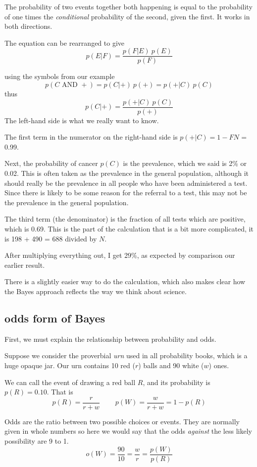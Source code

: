 \documentclass[11pt, oneside]{article}
\begin{document}
The probability of two events together both happening is equal to the probability of one times the \emph{conditional} probability of the second, given the first.  It works in both directions.

The equation can be rearranged to give
\[ p(E|F) = \frac{p(F|E) \ p(E)}{p(F)} \]

using the symbols from our example
\[ p(C \text{ AND } +) = p(C|+) \ p(+) = p(+|C) \ p(C) \]
thus
\[ p(C|+) = \frac{p(+|C) \ p(C)}{p(+)} \]
The left-hand side is what we really want to know.

The first term in the numerator on the right-hand side is $p(+|C) = 1- FN$ = 0.99.  

Next, the probability of cancer  $p(C)$ is the prevalence, which we said is 2\% or 0.02.  This is often taken as the prevalence in the general population, although it should really be the prevalence in all people who have been administered a test.  Since there is likely to be some reason for the referral to a test, this may not be the prevalence in the general population.

The third term (the denominator) is the fraction of all tests which are positive, which is 0.69.  This is the part of the calculation that is a bit more complicated, it is 198 + 490 = 688 divided by $N$.

After multiplying everything out, I get 29\%, as expected by comparison our earlier result.

There is a slightly easier way to do the calculation, which also makes clear how the Bayes approach reflects the way we think about science.

\subsection*{odds form of Bayes}

First, we must explain the relationship between probability and odds.

Suppose we consider the proverbial \emph{urn} used in all probability books, which is a huge opaque jar.  Our urn contains 10 red ($r$) balls and 90 white ($w$) ones.  

We can call the event of drawing a red ball $R$, and its probability is $p(R) = 0.10$.  That is
\[ p(R) = \frac{r}{r + w} \ \ \ \ \ \ \ \  \ \  p(W) = \frac{w}{r + w}  = 1 - p(R) \]

Odds are the ratio between two possible choices or events.  They are normally given in whole numbers so here we would say that the odds \emph{against} the less likely possibility are 9 to 1.
\[ o(W) = \frac{90}{10} =  \frac{w}{r} = \frac{p(W)}{p(R)}  \]
\end{document}
